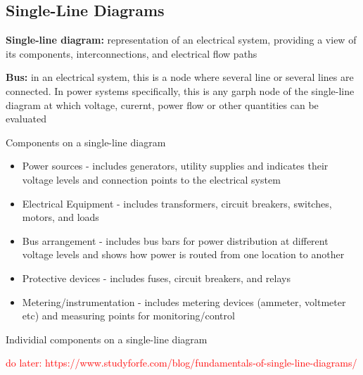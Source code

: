 \subsection{Single-Line Diagrams}

\begin{define}
    \textbf{Single-line diagram:} representation of an electrical system, providing a view of its components, interconnections, and electrical flow paths

    \textbf{Bus:} in an electrical system, this is a node where several line or several lines are connected. In power systems specifically, this is any garph node of the single-line diagram at which voltage, curernt, power flow or other quantities can be evaluated
\end{define}
Components on a single-line diagram
\begin{itemize}
    \item Power sources - includes generators, utility supplies and indicates their voltage levels and connection points to the electrical system
    \item Electrical Equipment - includes transformers, circuit breakers, switches, motors, and loads
    \item Bus arrangement - includes bus bars for power distribution at different voltage levels and shows how power is routed from one location to another
    \item Protective devices - includes fuses, circuit breakers, and relays
    \item Metering/instrumentation - includes metering devices (ammeter, voltmeter etc) and measuring points for monitoring/control
\end{itemize}

Individial components on a single-line diagram 

\textcolor{red}{do later: https://www.studyforfe.com/blog/fundamentals-of-single-line-diagrams/}

